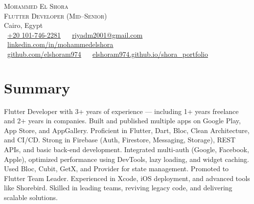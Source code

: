 \documentclass[letterpaper,11pt]{article}
\begin{document}
\begin{center}
    {\Huge \scshape Mohammed El Shora} \\ \vspace{2pt}
    {\Large \scshape Flutter Developer (Mid–Senior)} \\ \vspace{4pt}
    Cairo, Egypt \\ \vspace{1pt}
    \small
    \raisebox{-0.1\height}\faPhone\ \href{tel:+201017462281}{\underline{+20 101-746-2281}} ~
    \raisebox{-0.2\height}\faEnvelope\ \href{mailto:riyadm2001@gmail.com}{\underline{riyadm2001@gmail.com}} ~ 
    \raisebox{-0.2\height}\faLinkedin\ \href{https://linkedin.com/in/mohammedelshora/}{\underline{linkedin.com/in/mohammedelshora}} \\[5pt]
    \raisebox{-0.2\height}\faGithub\ \href{https://github.com/elshoram974}{\underline{github.com/elshoram974}} ~
    \raisebox{-0.2\height}\faGlobe\ \href{https://elshoram974.github.io/shora_portfolio/}{\underline{elshoram974.github.io/shora\_portfolio}}
    \vspace{-8pt}
\end{center}




\section{Summary}
\begin{itemize}[leftmargin=0.15in, label={}]
    \small{
        \item{
            Flutter Developer with 3+ years of experience — including 1+ years freelance and 2+ years in companies. Built and published multiple apps on Google Play, App Store, and AppGallery. Proficient in Flutter, Dart, Bloc, Clean Architecture, and CI/CD. Strong in Firebase (Auth, Firestore, Messaging, Storage), REST APIs, and basic back-end development. Integrated multi-auth (Google, Facebook, Apple), optimized performance using DevTools, lazy loading, and widget caching. Used Bloc, Cubit, GetX, and Provider for state management. Promoted to Flutter Team Leader. Experienced in Xcode, iOS deployment, and advanced tools like Shorebird. Skilled in leading teams, reviving legacy code, and delivering scalable solutions.
        }
    }
\end{itemize}


\vspace{-13pt}


\end{document}
